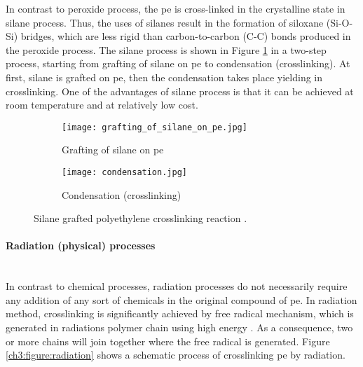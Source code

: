 In contrast to peroxide process, the \acrshort{pe} is cross-linked in the crystalline state in silane process. Thus, the uses of silanes result in the formation of siloxane (Si-O-Si) bridges, which are less rigid than carbon-to-carbon (C-C) bonds produced in the peroxide process. The silane process is shown in Figure \ref{ch3:figure:reaction} in a two-step process, starting from grafting of silane on \acrshort{pe} to condensation (crosslinking). At first, silane is grafted on \acrshort{pe}, then the condensation takes place yielding in crosslinking. One of the advantages of silane process is that it can be achieved at room temperature and at relatively low cost. 

\begin{figure}[H]
\captionsetup[subfigure]{justification=raggedright}
\centering

\begin{subfigure}{.9\textwidth}
    \centering
    \texttt{[image: grafting\_of\_silane\_on\_pe.jpg]}
    \caption{Grafting of silane on \acrshort{pe}}
\end{subfigure}
\begin{subfigure}{.9\textwidth}
    \vspace{1.2em}
    \centering
    \texttt{[image: condensation.jpg]}
    \caption{Condensation (crosslinking)}
\end{subfigure}

\caption{Silane grafted polyethylene crosslinking reaction \cite{kurtz2009cross}.}
\label{ch3:figure:reaction}
\end{figure}

\paragraph{Radiation (physical) processes} \hfill \\
In contrast to chemical processes, radiation processes do not necessarily require any addition of any sort of chemicals in the original compound of \acrshort{pe}. In radiation method, crosslinking is significantly achieved by free radical mechanism, which is generated in radiations polymer chain using high energy \cite{meola2005cross}. As a consequence, two or more chains will join together where the free radical is generated. Figure \ref{ch3:figure:radiation} shows a schematic process of crosslinking \acrshort{pe} by radiation. 

